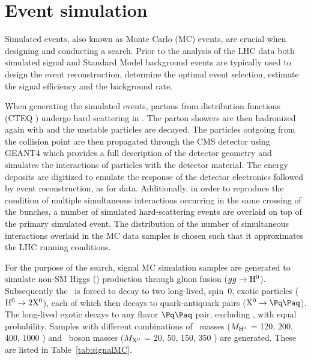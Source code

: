 \section{Event simulation}

Simulated events, also known as Monte Carlo (MC) events, are crucial when 
designing and conducting a search. Prior to the analysis of the LHC data 
both simulated signal and Standard Model background events
are typically used to design the event reconstruction, determine the optimal 
event selection, estimate the signal efficiency and the background rate.

When generating the simulated events, partons from distribution functions 
(CTEQ \cite{Bourilkov:2006cj}) undergo hard scattering in \PYTHIA \cite{PYTHIA}. 
The parton showers are then hadronized again with \PYTHIA and the unstable particles are decayed.
The particles outgoing from the collision point are then propagated through the CMS detector 
using GEANT4 \cite{GEANT4} which provides a full description of the detector geometry
and simulates
the interactions of particles with the detector material. The energy deposits are digitized
to emulate the response of the detector electronics followed by event reconstruction,
as for data. Additionally, in order to reproduce the 
condition of multiple simultaneous interactions occurring in the same crossing of the 
bunches, a number of simulated hard-scattering events are overlaid on top of the primary 
simulated event. The distribution of the number of simultaneous interactions overlaid in the
MC data samples is chosen such that it approximates the LHC running conditions.

For the purpose of the search, signal MC simulation samples are generated to
simulate non-SM Higgs (\Higgs) production through gluon fusion ($gg \to \mathrm{H}^{0}$). 
Subsequently the \Higgs~is forced to decay to two long-lived, spin~0, exotic particles
($\mathrm{H}^{0} \to 2\mathrm{X^{0}}$), each of which then decays to quark-antiquark pairs ($\X \to \qq$).
The long-lived exotic \X decays to any flavor $\qq$ pair, excluding \ttbar, with equal probability. Samples
with different combinations of \Higgs~masses ($M_{\mathrm{H}^{0}}$ = 120, 200, 400, 1000 \GeV ) and \X~boson masses
($M_{\mathrm{X^{0}}}$ = 20, 50, 150, 350 \GeV) are generated. These are listed in Table~\ref{tab:signalMC}.

